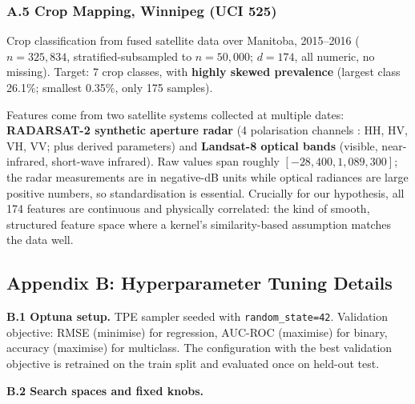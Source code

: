 \documentclass[
  11pt,
  onecolumn]{article}
\begin{document}
\subsubsection{A.5 Crop Mapping, Winnipeg (UCI
525)}\label{a.5-crop-mapping-winnipeg-uci-525}

Crop classification from fused satellite data over Manitoba, 2015--2016
(\(n=325{,}834\), stratified-subsampled to \(n=50{,}000\); \(d=174\),
all numeric, no missing). Target: 7 crop classes, with \textbf{highly
skewed prevalence} (largest class 26.1\%; smallest 0.35\%, only 175
samples).

Features come from two satellite systems collected at multiple dates:
\textbf{RADARSAT-2 synthetic aperture radar} (4 polarisation channels
: HH, HV, VH, VV; plus derived parameters) and \textbf{Landsat-8
optical bands} (visible, near-infrared, short-wave infrared). Raw values
span roughly \([-28{,}400, 1{,}089{,}300]\); the radar measurements
are in negative-dB units while optical radiances are large positive
numbers, so standardisation is essential. Crucially for our
hypothesis, all 174 features are continuous and physically correlated:
the kind of smooth, structured feature space where a kernel's
similarity-based assumption matches the data well.

\subsection{Appendix B: Hyperparameter Tuning
Details}\label{appendix-b-hyperparameter-tuning-details}

\textbf{B.1 Optuna setup.} TPE sampler seeded with
\texttt{random\_state=42}. Validation objective: RMSE (minimise) for
regression, AUC-ROC (maximise) for binary, accuracy (maximise) for
multiclass. The configuration with the best validation objective is
retrained on the train split and evaluated once on held-out test.

\textbf{B.2 Search spaces and fixed knobs.}
\end{document}
